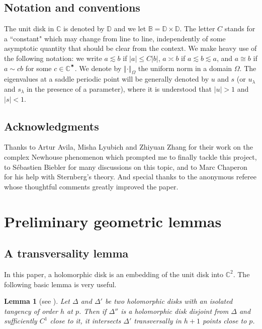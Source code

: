 \documentclass[11pt, oneside]{amsart}
\newcommand{\C}{\mathbb{C}}
\newcommand{\B}{\mathbb{B}}
\newcommand{\D}{\mathbb{D}}
\newcommand{\norm}[1]{\left\Vert#1\right\Vert}
\newcommand{\abs}[1]{\left\vert#1\right\vert}
\newtheorem{lem}[prop] {Lemma}
\theoremstyle{remark}
\theoremstyle{definition}
\theoremstyle{theorem}
\newcommand{\commentaire}[1]{}
\begin{document}
\subsection*{Notation and conventions} 
The unit disk in $\C$ is denoted by $\D$ and we let $\B  = \D\times \D$. 
The letter $C$ stands for a ``constant" which may change from line to line,   independently of 
some asymptotic quantity that should be clear from the context.  
We make heavy use of the following notation: we write
 $a\lesssim b$ if $\abs{a}\leq C\abs{b}$, $a\asymp b$ if $a\lesssim b \lesssim a$, and 
 $a\cong b$ if $a\sim cb$ for some $c\in \C^\varstar$.
 We denote by $\norm{\cdot}_\Omega$ the uniform norm in a domain $\Omega$. 
The eigenvalues at a saddle periodic point will be generally denoted by $u$ and $s$ (or $u_\lambda$ and $s_\lambda$ in the presence of a parameter), where it is understood that $\abs{u}>1$ and $\abs{s}<1$. 


\subsection*{Acknowledgments} Thanks to Artur Avila, Misha Lyubich and Zhiyuan Zhang for their 
work on the complex Newhouse phenomenon which prompted me to finally tackle this project,
  to Sébastien Biebler for  many  discussions on this topic, and to Marc Chaperon for his help 
  with Sternberg's theory. And special thanks to the anonymous referee whose 
  thoughtful comments greatly improved the paper.


\section{Preliminary geometric lemmas}\label{sec:geometric_lemmas}

 

\subsection{A transversality lemma}  In this paper, a holomorphic disk is an embedding of the unit disk into $\C^2$\commentaire{cf. Minor comment \#2}.    
The following basic lemma is very useful.

\begin{lem}[see {\cite[Lem. 6.4]{bls}}] \label{lem:6.4}
Let $\Delta$ and $\Delta'$ be two holomorphic disks with an isolated tangency of order $h$ at $p$. Then if $\Delta''$ is a holomorphic disk  disjoint from  $\Delta$ and sufficiently $C^1$ close to it, 
it intersects $\Delta'$ transversally in $h+1$ points close to $p$.
\end{lem}
\end{document}
